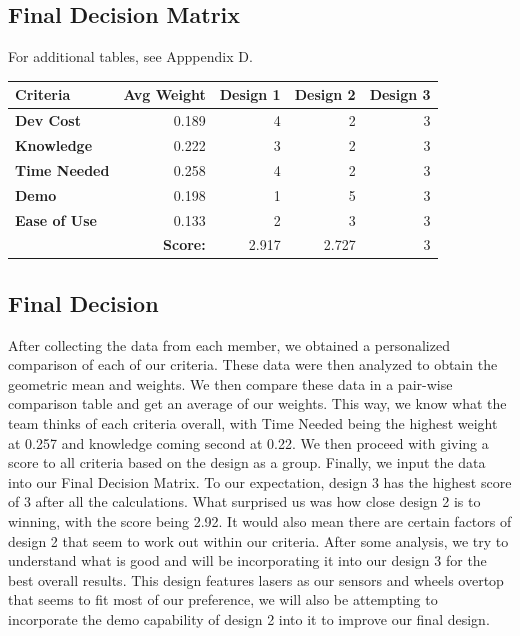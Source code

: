 \documentclass[12pt]{article}
\newcommand\cellhead[1]{\cellcolor{lightgray}\textbf{ #1 }}
\begin{document}
        \subsection{Final Decision Matrix}
            \noindent For additional tables, see Apppendix D.

            \begin{center}\begin{tabular}{|l|r|r|r|r|}
                \hline
                \cellhead{Criteria} & \cellhead{Avg Weight} & \cellhead{Design 1} & \cellhead{Design 2} & \cellhead{Design 3} \\\hline
                \cellhead{Dev Cost} & 0.189 & 4 & 2 & 3 \\\hline
                \cellhead{Knowledge}& 0.222 & 3 & 2 & 3 \\\hline
                \cellhead{Time Needed} & 0.258 & 4 & 2 & 3 \\\hline
                \cellhead{Demo} & 0.198 & 1 & 5 & 3 \\\hline
                \cellhead{Ease of Use} & 0.133 & 2 & 3 & 3 \\\hline
                & \cellhead{Score:} & 2.917 & 2.727 & 3 \\\hline
            \end{tabular}\end{center}
        
        \subsection{Final Decision}
            After collecting the data from each member, we obtained a personalized comparison of each of our criteria. These data were then analyzed to obtain the geometric mean and weights. We then compare these data in a pair-wise comparison table and get an average of our weights. This way, we know what the team thinks of each criteria overall, with Time Needed being the highest weight at 0.257 and knowledge coming second at 0.22. We then proceed with giving a score to all criteria based on the design as a group. Finally, we input the data into our Final Decision Matrix. To our expectation, design 3 has the highest score of 3 after all the calculations. What surprised us was how close design 2 is to winning, with the score being 2.92. It would also mean there are certain factors of design 2 that seem to work out within our criteria. After some analysis, we try to understand what is good and will be incorporating it into our design 3 for the best overall results. This design features lasers as our sensors and wheels overtop that seems to fit most of our preference, we will also be attempting to incorporate the demo capability of design 2 into it to improve our final design.
\end{document}
